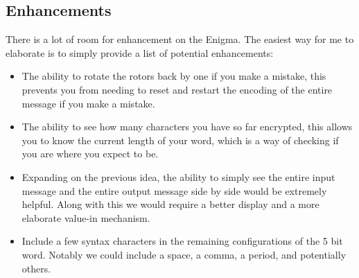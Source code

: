 \documentclass{article}
\begin{document}
\subsection{Enhancements}
There is a lot of room for enhancement on the Enigma. The easiest way for me to elaborate is to simply provide a list of potential enhancements: 
\begin{itemize}
    \item The ability to rotate the rotors back by one if you make a mistake, this prevents you from needing to reset and restart the encoding of the entire message if you make a mistake. 
    \item The ability to see how many characters you have so far encrypted, this allows you to know the current length of your word, which is a way of checking if you are where you expect to be. 
    \item Expanding on the previous idea, the ability to simply see the entire input message and the entire output message side by side would be extremely helpful. Along with this we would require a better display and a more elaborate value-in mechanism. 
    \item Include a few syntax characters in the remaining configurations of the 5 bit word. Notably we could include a space, a comma, a period, and potentially others. 
\end{itemize}
\clearpage



\end{document}
